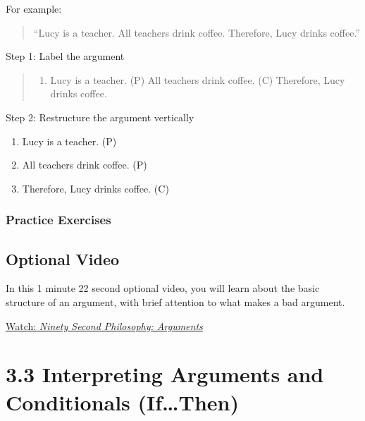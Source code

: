 \documentclass[
]{book}
\providecommand{\tightlist}{%
  \setlength{\itemsep}{0pt}\setlength{\parskip}{0pt}}
\begin{document}
\begin{reflect}
For example:

\begin{quote}
``Lucy is a teacher. All teachers drink coffee. Therefore, Lucy drinks coffee.''
\end{quote}

Step 1: Label the argument

\begin{quote}
\begin{enumerate}
\def\labelenumi{(\Alph{enumi})}
\setcounter{enumi}{15}
\tightlist
\item
  Lucy is a teacher. (P) All teachers drink coffee. (C) Therefore, Lucy drinks coffee.
\end{enumerate}
\end{quote}

Step 2: Restructure the argument vertically

\begin{enumerate}
\def\labelenumi{\arabic{enumi}.}
\tightlist
\item
  Lucy is a teacher. (P)
\item
  All teachers drink coffee. (P)
\item
  Therefore, Lucy drinks coffee. (C)
\end{enumerate}

\hypertarget{practice-exercises}{%
\subsubsection*{Practice Exercises}\label{practice-exercises}}
\end{reflect}

\hypertarget{optional-video-9}{%
\subsection*{Optional Video}\label{optional-video-9}}

\begin{reflect}
In this 1 minute 22 second optional video, you will learn about the basic structure of an argument, with brief attention to what makes a bad argument.

\href{https://www.youtube.com/watch?v=Z7f_uuy1JcM}{Watch: \emph{Ninety Second Philosophy: Arguments}}
\end{reflect}

\hypertarget{interpreting-arguments-and-conditionals-ifthen}{%
\section*{3.3 Interpreting Arguments and Conditionals (If\ldots Then)}\label{interpreting-arguments-and-conditionals-ifthen}}
\end{document}
